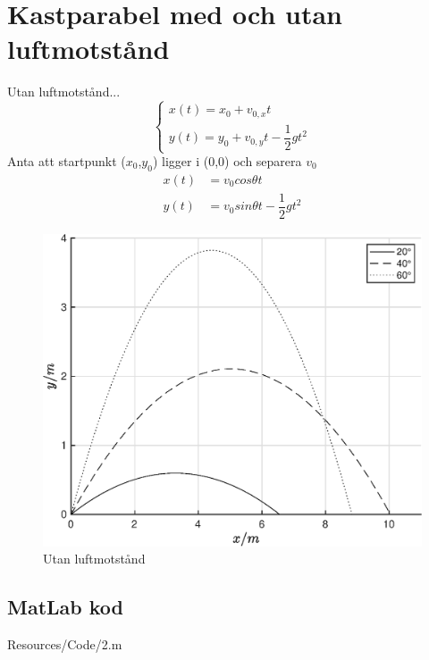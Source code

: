 \section*{\centering Kastparabel med och utan luftmotstånd}

Utan luftmotstånd...
\begin{equation} \label{eq:xyt}
    \begin{cases}
        x(t) = x_0 + v_{0,x}t \\
        y(t) = y_0 + v_{0,y}t - \dfrac{1}{2}gt^2
    \end{cases}
\end{equation}
Anta att startpunkt ($x_0$,$y_0$) ligger i (0,0) och separera $v_0$ 
\begin{align}
    x(t) &= v_0cos\theta t \label{eq:xt}\\
    y(t) &= v_0sin\theta t - \dfrac{1}{2}gt^2 \label{eq:yt}
\end{align}

\begin{figure}[H]
    \centering
    \captionsetup{justification=centering,margin=2cm}
    \includegraphics[scale=0.5]{Resources/Graphics/fig2_1.eps}
    \caption{Utan luftmotstånd}
    \label{fig:2_1}
\end{figure}



\np
\subsection*{MatLab kod}
 {Resources/Code/2.m}